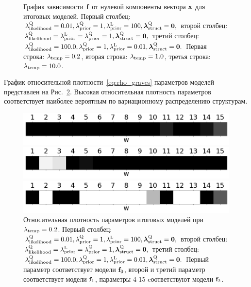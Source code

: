 \begin{figure}
\caption{График зависимости $\mathbf{f}$ от нулевой компоненты вектора $\mathbf{x}$ для итоговых моделей.
Первый столбец: $\lambda_\text{likelihood}^\text{Q} = 0.01, \lambda_\text{prior}^\text{Q} = 1, \lambda_\text{prior}^\text{L} = 100, \boldsymbol{\lambda}_\text{struct}^\text{Q} = \mathbf{0},$  второй столбец: $\lambda_\text{likelihood}^\text{Q} = \lambda_\text{prior}^\text{L} = \lambda_\text{prior}^\text{Q} = 1, \boldsymbol{\lambda}_\text{struct}^\text{Q} = \mathbf{0},$ 
третий столбец: $\lambda_\text{likelihood}^\text{Q} = 100.0, \lambda_\text{prior}^\text{Q} = 1, \lambda_\text{prior}^\text{L} = 0.01, \boldsymbol{\lambda}_\text{struct}^\text{Q} = \mathbf{0}.$ 
Первая строка: $\lambda_{\text{temp}} = 0.2$, вторая строка: $\lambda_{\text{temp}} = 1.0$, третья строка: $\lambda_{\text{temp}} = 10.0$.}
\label{fig:fig_plot_synthetic_results}
\end{figure}




График относительной плотности~\eqref{eq:rho_graves} параметров моделей представлен на Рис.~\ref{fig:bar_rho}. Высокая относительная плотность параметров соответствует наиболее вероятным по вариационному распределению структурам.


\begin{figure}
 \begin{minipage}[]{.3\textwidth}
    \includegraphics[width=\textwidth]{plots/experiment_structures/bar_0_2kld.png}
\subcaption{}
\end{minipage}
 \begin{minipage}{.3\textwidth}
    \includegraphics[width=\textwidth]{plots/experiment_structures/bar_0_2elbo.png}
\subcaption{}
\end{minipage}
 \begin{minipage}{.3\textwidth}
    \includegraphics[width=\textwidth]{plots/experiment_structures/bar_0_2overfit.png}
\subcaption{}
\end{minipage}


\caption{Относительная плотность параметров итоговых моделей при $\lambda_{\text{temp}} = 0.2$.
Первый столбец: $\lambda_\text{likelihood}^\text{Q} = 0.01, \lambda_\text{prior}^\text{Q} = 1, \lambda_\text{prior}^\text{L} = 100, \boldsymbol{\lambda}_\text{struct}^\text{Q} = \mathbf{0},$  второй столбец: $\lambda_\text{likelihood}^\text{Q} = \lambda_\text{prior}^\text{L} = \lambda_\text{prior}^\text{Q} = 1, \boldsymbol{\lambda}_\text{struct}^\text{Q} = \mathbf{0},$ 
третий столбец: $\lambda_\text{likelihood}^\text{Q} = 100.0, \lambda_\text{prior}^\text{Q} = 1, \lambda_\text{prior}^\text{L} = 0.01, \boldsymbol{\lambda}_\text{struct}^\text{Q} = \mathbf{0}.$ Первый параметр соответствует модели $\mathbf{f}_0$, второй и третий параметр соответствует модели $\mathbf{f}_1$, параметры 4-15 cоответствуют модели $\mathbf{f}_2$.}
\label{fig:bar_rho}
\end{figure}


